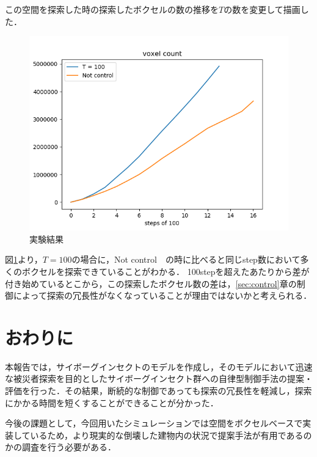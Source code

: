 \documentclass[a4paper,11pt]{jarticle}
\begin{document}
	この空間を探索した時の探索したボクセルの数の推移を$T$の数を変更して描画した．
	\begin{figure}
		\centering
		\includegraphics[width=0.8\linewidth]{png/graph_voxel-alt.png}
		\caption[実験結果]{実験結果}
		\label{fig:graph_voxel}
	\end{figure}
	図\ref{fig:graph_voxel}より，$T = 100$の場合に，Not control　の時に比べると同じstep数において多くのボクセルを探索できていることがわかる．
	100stepを超えたあたりから差が付き始めているとこから，この探索したボクセル数の差は，\ref{sec:control}章の制御によって探索の冗長性がなくなっていることが理由ではないかと考えられる．
	
	\section{おわりに}
	\label{sec:last}
	本報告では，サイボーグインセクトのモデルを作成し，そのモデルにおいて迅速な被災者探索を目的としたサイボーグインセクト群への自律型制御手法の提案・評価を行った．その結果，断続的な制御であっても探索の冗長性を軽減し，探索にかかる時間を短くすることができることが分かった．
	
	今後の課題として，今回用いたシミュレーションでは空間をボクセルベースで実装しているため，より現実的な倒壊した建物内の状況で提案手法が有用であるのかの調査を行う必要がある．
\end{document}
